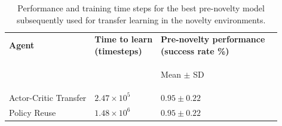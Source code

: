 %
\begin{table}[t]
\begin{center}
\small
\begin{tabular}{>{\centering}p{2.5cm}>{\centering}p{2.0cm}>{\centering}p{2.8cm}p{1.3cm}}
\arrayrulecolor{taupegray}\toprule
 \multicolumn{3}{c}{\textbf{Pre-novelty}} \tabularnewline
 \midrule
\centering \textbf{Agent} & \centering {\textbf{Time to learn\\(timesteps)}} &\centering \textbf{Pre-novelty performance\\(success rate \%)}\tabularnewline
 \midrule
 &\begin{small} \end{small}
 & \begin{small}Mean $\pm$ SD\end{small}
\tabularnewline
 \midrule
Actor-Critic Transfer  & $2.47 \times 10^5$ &\centering $0.95 \pm 0.22$ \tabularnewline
Policy Reuse  & $1.48 \times 10^6$ &\centering $0.95 \pm 0.22$ \tabularnewline
\bottomrule
\end{tabular}
\caption[Pre-novelty baseline performance]{Performance and training time steps for the best pre-novelty model subsequently used for transfer learning in the novelty environments.}
\label{tab:baseline_prenovelty_performance}
\end{center}
\end{table}
%
